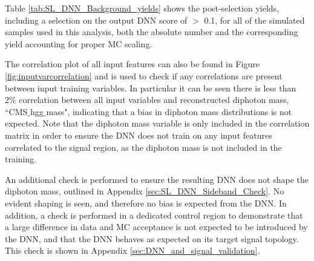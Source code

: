 
Table \ref{tab:SL_DNN_Background_yields} shows the post-selection yields, including a selection on the output DNN score of $>$ 0.1, for all of the simulated samples
used in this analysis, both the absolute number and the corresponding yield accounting for proper MC scaling.

The correlation plot of all input features can also be found in Figure \ref{fig:inputvarcorrelation} and is used to check if any correlations are present between input training variables. In particular it can 
be seen there is less than 2\% correlation between all input variables and reconstructed diphoton mass, ``CMS$\_$hgg$\_$mass", indicating that a bias in diphoton mass distributions is 
not expected. Note that the diphoton mass variable is only included in the correlation 
matrix in order to ensure the DNN does not train on any input features correlated to the signal region, as the diphoton mass is not included in the training. 

An additional check is 
performed to ensure the resulting DNN does not shape the diphoton mass, outlined in Appendix \ref{sec:SL_DNN_Sideband_Check}. No evident shaping is seen, and therefore no bias is expected from the DNN. In addition,
a check is performed in a dedicated control region to demonstrate that a large difference in data and MC acceptance is not expected to be introduced by the DNN, and that the DNN behaves as expected on its target signal topology. This check is shown in Appendix \ref{sec:DNN_and_signal_validation}. 

